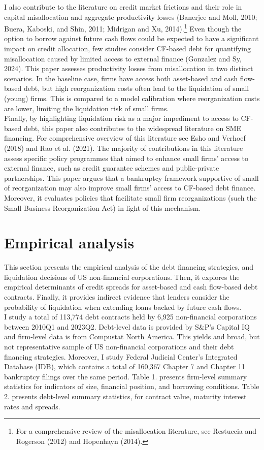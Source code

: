 \documentclass[12pt]{article}
\begin{document}
I also contribute to the literature on credit market frictions and their role in capital misallocation and aggregate productivity losses (Banerjee and Moll, 2010; Buera, Kaboski, and Shin, 2011; Midrigan and Xu, 2014).\footnote{For a comprehensive review of the misallocation literature, see Restuccia and Rogerson (2012) and Hopenhayn (2014).} Even though the option to borrow against future cash flows could be expected to have a significant impact on credit allocation, few studies consider CF-based debt for quantifying misallocation caused by limited access to external finance (Gonzalez and Sy, 2024). This paper assesses productivity losses from misallocation in two distinct scenarios. In the baseline case, firms have access both asset-based and cash flow-based debt, but high reorganization costs often lead to the liquidation of small (young) firms. This is compared to a model calibration where reorganization costs are lower, limiting the liquidation risk of small firms. \vspace{3mm} \\
Finally, by highlighting liquidation risk as a major impediment to access to CF-based debt, this paper also contributes to the widespread literature on SME financing. For comprehensive overview of this literature see Esho and Verhoef (2018) and Rao et al. (2021). The majority of contributions in this literature assess specific policy programmes that aimed to enhance small firms' access to external finance, such as credit guarantee schemes and public-private partnerships. This paper argues that a bankruptcy framework supportive of small of reorganization may also improve small firms' access to CF-based debt finance. Moreover, it evaluates policies that facilitate small firm reorganizations (such the Small Business Reorganization Act) in light of this mechanism. 

\section{Empirical analysis \label{sec:empirical analysis}}
This section presents the empirical analysis of the debt financing strategies, and liquidation decisions of US non-financial corporations. Then, it explores the empirical determinants of credit spreads for asset-based and cash flow-based debt contracts. Finally, it provides indirect evidence that lenders consider the probability of liquidation when extending loans backed by future cash flows. \vspace{3mm} \\
I study a total of 113,774 debt contracts held by 6,925 non-financial corporations between 2010Q1 and 2023Q2. Debt-level data is provided by S\&P's Capital IQ and firm-level data is from Compustat North America. This yields and broad, but not representative sample of US non-financial corporations and their debt financing strategies. Moreover, I study Federal Judicial Center's Integrated Database (IDB), which contains a total of 160,367 Chapter 7 and Chapter 11 bankruptcy filings over the same period. Table 1. presents firm-level summary statistics for indicators of size, financial position, and borrowing conditions. Table 2. presents debt-level summary statistics, for contract value, maturity interest rates and spreads. 
\end{document}
